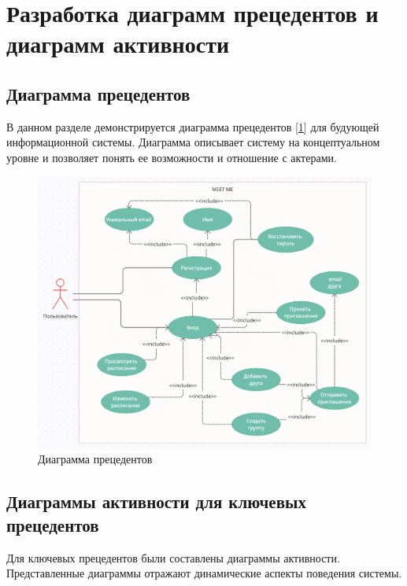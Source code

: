 \documentclass[14pt]{extreport}
\begin{document}
        



\newpage

    \section{Разработка диаграмм прецедентов и диаграмм активности }

        \subsection{Диаграмма прецедентов}
        В данном разделе демонстрируется диаграмма прецедентов [\ref{fig:uml1}]  для будующей информационной системы. Диаграмма описывает систему на концептуальном уровне и позволяет понять ее возможности и отношение с актерами.
        \begin{figure}[h]   
            \centering
            \includegraphics[width=0.8\linewidth]{img/d1.png}
            \caption{ Диаграмма прецедентов}
            \label{fig:uml1}
        \end{figure}
        
        \subsection{Диаграммы активности для ключевых прецедентов}
        Для ключевых прецедентов были составлены диаграммы активности. Представленные диаграммы отражают динамические аспекты поведения системы.
        
\end{document}
